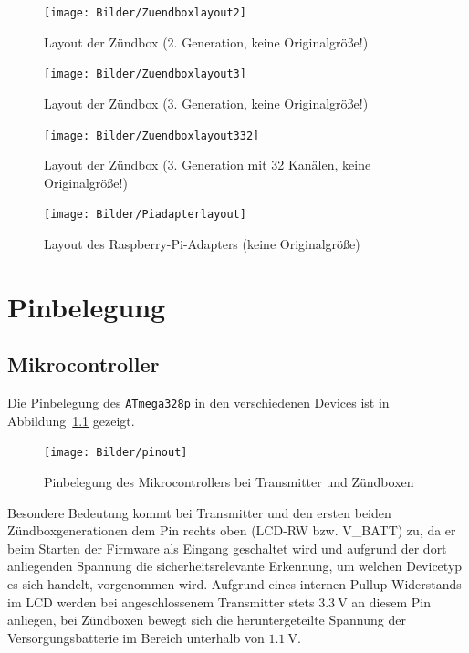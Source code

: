\documentclass[paper=a4, parskip, numbers=noenddot, toc=listof, headsepline]{scrbook}
\begin{document}
		\begin{figure}
			\centering
			\texttt{[image: Bilder/Zuendboxlayout2]}
			\caption{Layout der Zündbox (2. Generation, keine Originalgröße!)}
			\label{fig:zuendbox2layout}
		\end{figure}
		\begin{figure}
			\centering
			\texttt{[image: Bilder/Zuendboxlayout3]}
			\caption{Layout der Zündbox (3. Generation, keine Originalgröße!)}
			\label{fig:zuendbox3layout}
		\end{figure}
		\begin{figure}
			\centering
			\texttt{[image: Bilder/Zuendboxlayout332]}
			\caption{Layout der Zündbox (3. Generation mit 32 Kanälen, keine Originalgröße!)}
			\label{fig:zuendbox332layout}
		\end{figure}	
		\begin{figure}
			\centering
			\texttt{[image: Bilder/Piadapterlayout]}
			\caption{Layout des Raspberry-Pi-Adapters (keine Originalgröße)}
			\label{fig:piadapterlayout}
		\end{figure}

		\begin{refsection}
			\newrefcontext[sorting=nty]
			\nocite{*} %
			\printbibliography[title=Datenblätter, heading=bibnumbered]
			\label{sec:datasheets}
		\end{refsection}

	\chapter{Pinbelegung}
		\label{ch:pinbelegung}

		\section{Mikrocontroller}
			Die Pinbelegung des \texttt{ATmega328p} in den verschiedenen Devices ist in Abbildung~\ref{fig:pinout} gezeigt.

			\begin{figure}
				\centering
				\texttt{[image: Bilder/pinout]}
				\caption{Pinbelegung des Mikrocontrollers bei Transmitter und Zündboxen}
				\label{fig:pinout}
			\end{figure}

			Besondere Bedeutung kommt bei Transmitter und den ersten beiden Zündboxgenerationen dem Pin rechts oben (LCD-RW bzw. V\_BATT) zu, da er beim Starten der Firmware als Eingang geschaltet wird und aufgrund der dort anliegenden Spannung die sicherheitsrelevante Erkennung, um welchen Devicetyp es sich handelt, vorgenommen wird. Aufgrund eines internen Pullup-Widerstands im LCD werden bei angeschlossenem Transmitter stets $\SI{3,3}{\volt}$ an diesem Pin anliegen, bei Zündboxen bewegt sich die heruntergeteilte Spannung der Versorgungsbatterie im Bereich unterhalb von $\SI{1,1}{\volt}$.
\end{document}

